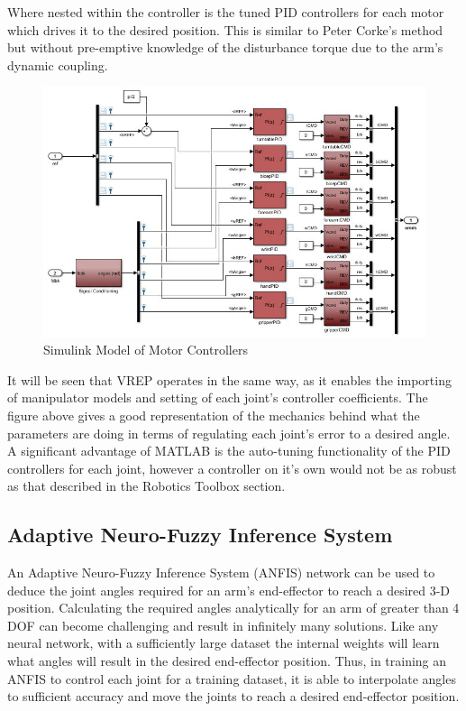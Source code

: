 \documentclass[12pt,openany,a4paper]{book}
\begin{document}
Where nested within the controller is the tuned PID controllers for each motor which drives it to the desired position. This is similar to Peter Corke's method but without pre-emptive knowledge of the disturbance torque due to the arm's dynamic coupling.

\begin{center}
\begin{figure}[htb]
  \includegraphics[width=\linewidth]{simulink_motor_control_PID.jpg}
\caption{Simulink Model of Motor Controllers}
\end{figure}
\end{center}

It will be seen that VREP operates in the same way, as it enables the importing of manipulator models and setting of each joint's controller coefficients. The figure above gives a good representation of the mechanics behind what the parameters are doing in terms of regulating each joint's error to a desired angle. A significant advantage of MATLAB is the auto-tuning functionality of the PID controllers for each joint, however a controller on it's own would not be as robust as that described in the Robotics Toolbox section.

\subsection{Adaptive Neuro-Fuzzy Inference System}
An Adaptive Neuro-Fuzzy Inference System (ANFIS) network can be used to deduce the joint angles required for an arm's end-effector to reach a desired 3-D position. Calculating the required angles analytically for an arm of greater than 4 DOF can become challenging and result in infinitely many solutions. Like any neural network, with a sufficiently large dataset the internal weights will learn what angles will result in the desired end-effector position. Thus, in training an ANFIS to control each joint for a training dataset, it is able to interpolate angles to sufficient accuracy and move the joints to reach a desired end-effector position.
\end{document}
